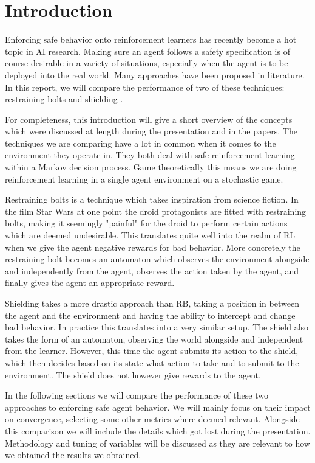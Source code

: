 \documentclass[letterpaper]{article}
\begin{document}
\section{Introduction} %
Enforcing safe behavior onto reinforcement learners has recently become a hot topic in AI research. Making sure an agent follows a safety specification is of course desirable in a variety of situations, especially when the agent is to be deployed into the real world. 
Many approaches have been proposed in literature. In this report, we will compare the performance of two of these techniques: restraining bolts \cite{de2019foundations} and shielding \cite{alshiekh2018safe}.
\par For completeness, this introduction will give a short overview of the concepts which were discussed at length during the presentation and in the papers. The techniques we are comparing have a lot in common when it comes to the environment they operate in. They both deal with safe reinforcement learning within a Markov decision process. Game theoretically this means we are doing reinforcement learning in a single agent environment on a stochastic game.
\par Restraining bolts is a technique which takes inspiration from science fiction. In the film Star Wars at one point the droid protagonists are fitted with restraining bolts, making it seemingly "painful" for the droid to perform certain actions which are deemed undesirable. This translates quite well into the realm of RL when we give the agent negative rewards for bad behavior. More concretely the restraining bolt becomes an automaton which observes the environment alongside and independently from the agent, observes the action taken by the agent, and finally gives the agent an appropriate reward.
\par Shielding takes a more drastic approach than RB, taking a position in between the agent and the environment and having the ability to intercept and change bad behavior. In practice this translates into a very similar setup. The shield also takes the form of an automaton, observing the world alongside and independent from the learner. However, this time the agent submits its action to the shield, which then decides based on its state what action to take and to submit to the environment. The shield does not however give rewards to the agent.
\\ \par In the following sections we will compare the performance of these two approaches to enforcing safe agent behavior. We will mainly focus on their impact on convergence, selecting some other metrics where deemed relevant. Alongside this comparison we will include the details which got lost during the presentation. Methodology and tuning of variables will be discussed as they are relevant to how we obtained the results we obtained.
\end{document}
